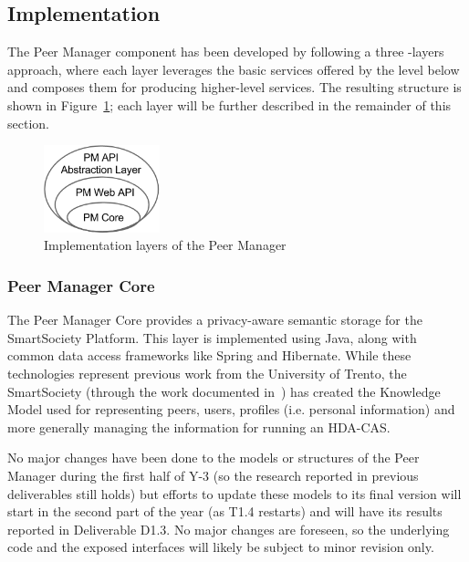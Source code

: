\subsection{Implementation}

The Peer Manager component has been developed by following a three -layers approach, where each layer leverages the basic services offered by the level below and composes them for producing higher-level services. The resulting structure is shown in Figure~\ref{fig:pm-component-layers}; each layer will be further described in the remainder of this section. 

\begin{figure}[htbp]
\centering
\includegraphics[width=0.3\textwidth]{figures/pm-component-layers.png}
\caption{Implementation layers of the Peer Manager}
\label{fig:pm-component-layers}
\end{figure}


\subsubsection{Peer Manager Core}
The Peer Manager Core provides a privacy-aware semantic storage for the SmartSociety Platform. This layer is implemented using Java, along with common data access frameworks like Spring and Hibernate.
While these technologies represent previous work from the University of Trento, the SmartSociety (through the work documented in~\cite{D1.1,D4.1,D4.2}) has created the Knowledge Model used for representing peers, users, profiles (i.e. personal information) and more generally managing the information for running an HDA-CAS.

No major changes have been done to the models or structures of the Peer Manager during the first half of Y-3 (so the research reported in previous deliverables still holds) but efforts to update these models to its final version will start in the second part of the year (as T1.4 restarts) and will have its results reported in Deliverable D1.3. No major changes are foreseen, so the underlying code and the exposed interfaces will likely be subject to minor revision only. 


